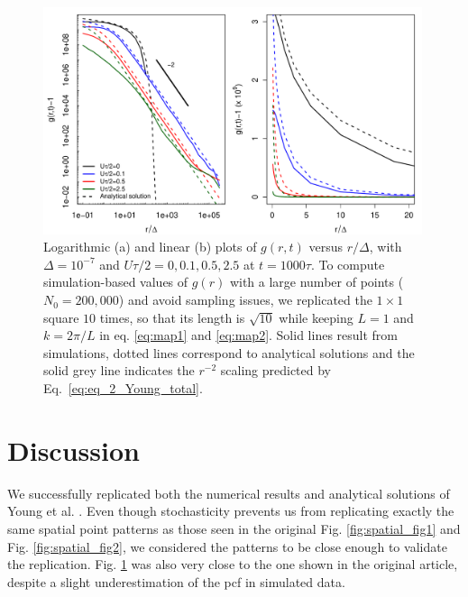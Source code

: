 \begin{figure}[H]
\begin{center}
 \includegraphics[width=0.99\textwidth]{../code/figure/pcf_test_Utot_modif_dx_dp.pdf}
 \caption{Logarithmic (a) and linear (b) plots of $g(r,t)$ versus $r/\Delta$, with $\Delta=10^{-7}$ and $U\tau/2=0,0.1,0.5,2.5$ at $t=1000\tau$. To compute simulation-based values of $g(r)$ with a large number of points ($N_0=200,000$) and avoid sampling issues, we replicated the $1\times 1$ square $10$ times, so that its length is $\sqrt{10}$ while keeping $L=1$ and $k=2\pi/L$ in eq. \ref{eq:map1} and \ref{eq:map2}. Solid lines result from simulations, dotted lines correspond to analytical solutions and the solid grey line indicates the $r^{-2}$ scaling predicted by Eq.~\ref{eq:eq_2_Young_total}.}
  \label{fig:pcf_Fig3}
\end{center}
  \end{figure} 
 
\section*{Discussion}

We successfully replicated both the numerical results and analytical solutions of Young et al. \citep{young_reproductive_2001}. Even though stochasticity prevents us from replicating exactly the same spatial point patterns as those seen in the original Fig. \ref{fig:spatial_fig1} and Fig. \ref{fig:spatial_fig2}, we considered the patterns to be close enough to validate the replication. Fig. \ref{fig:pcf_Fig3} was also very close to the one shown in the original article, despite a slight underestimation of the pcf in simulated data.\\

